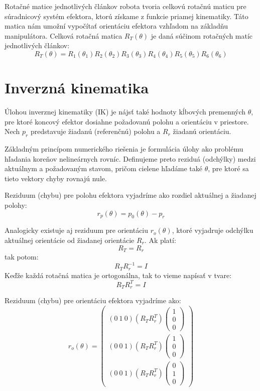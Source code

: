 Rotačné matice jednotlivých článkov robota tvoria celkovú rotačnú maticu pre súradnicový systém efektora, ktorú získame z funkcie priamej kinematiky. 
Táto matica nám umožní vypočítať orientáciu efektora vzhľadom na základňu manipulátora.
Celková rotačná matica $R_T(\theta)$ je daná súčinom rotačných matíc jednotlivých článkov:
\begin{equation} \label{eq:RT_theta}
R_T(\theta) = R_1(\theta_1)R_2(\theta_2)R_3(\theta_3)R_4(\theta_4)R_5(\theta_5)R_6(\theta_6)
\end{equation}

\section{Inverzná kinematika}
Úlohou inverznej kinematiky (IK) je nájsť také hodnoty kĺbových premenných $\theta$, pre ktoré koncový efektor dosiahne požadovanú polohu a orientáciu v priestore. 
Nech $p_r$ predstavuje žiadanú (referenčnú) polohu a $R_r$ žiadanú orientáciu. 

Základným princípom numerického riešenia je formulácia úlohy ako problému hľadania koreňov nelineárnych rovníc. Definujeme preto reziduá (odchýlky) medzi aktuálnym 
a požadovaným stavom, pričom cielene hľadáme také $\theta$, pre ktoré sa tieto vektory chyby rovnajú nule.

Reziduum (chybu) pre polohu efektora vyjadríme ako rozdiel aktuálnej a žiadanej polohy:
\begin{equation}
r_p(\theta) = p_0(\theta) - p_r
\end{equation}

Analogicky existuje aj reziduum pre orientáciu $r_o(\theta)$, ktoré vyjadruje odchýlku aktuálnej orientácie od žiadanej orientácie $R_r$. 
Ak platí:
\begin{equation}
R_T=R_r
\end{equation}
tak potom:
\begin{equation}
R_TR_r^{-1}=I
\end{equation}
Keďže každá rotačná matica je ortogonálna, tak to vieme napísať v tvare:
\begin{equation}
R_TR_r^T=I
\end{equation}

Reziduum (chybu) pre orientáciu efektora vyjadríme ako:
\begin{equation}
r_o(\theta) = \begin{pmatrix}
(0 \ 1 \ 0)(R_T R_r^T)\begin{pmatrix} 1 \\ 0 \\ 0 \end{pmatrix} \\
(0 \ 0 \ 1)(R_T R_r^T)\begin{pmatrix} 1 \\ 0 \\ 0 \end{pmatrix} \\
(0 \ 0 \ 1)(R_T R_r^T)\begin{pmatrix} 0 \\ 1 \\ 0 \end{pmatrix}
\end{pmatrix}
\end{equation}

